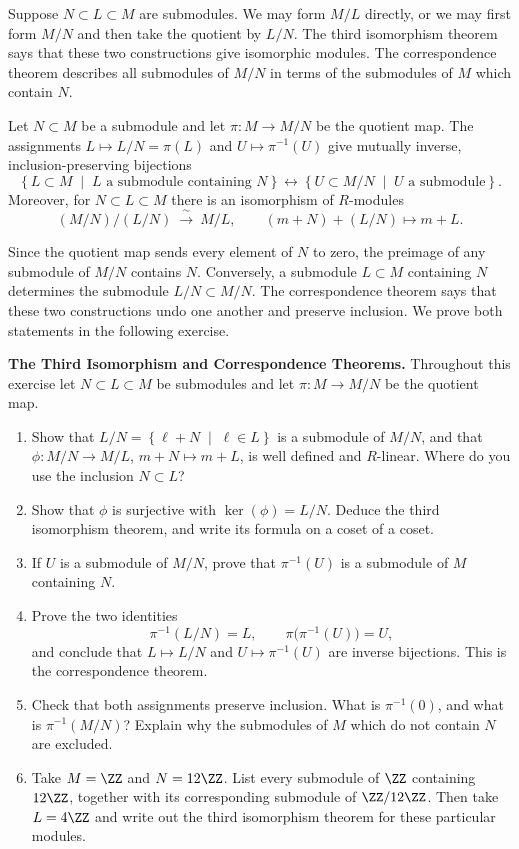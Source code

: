 \documentclass[12pt,reqno]{amsart}
\begin{document}
Suppose $N\subset L\subset M$ are submodules. We may form $M/L$ directly, or we may first form $M/N$ and then take the quotient by $L/N$. The third isomorphism theorem says that these two constructions give isomorphic modules. The correspondence theorem describes all submodules of $M/N$ in terms of the submodules of $M$ which contain $N$.

\begin{theorem}
Let $N\subset M$ be a submodule and let $\pi:M\to M/N$ be the quotient map. The assignments $L\mapsto L/N=\pi(L)$ and $U\mapsto \pi^{-1}(U)$ give mutually inverse, inclusion-preserving bijections
\[
 \left\{L\subset M \;\; \big| \;\; L\text{ a submodule containing }N\right\}
 \longleftrightarrow
 \left\{U\subset M/N \;\; \big| \;\; U\text{ a submodule}\right\}.
\]
Moreover, for $N\subset L\subset M$ there is an isomorphism of $R$-modules
\[
 (M/N)/(L/N)\ \xrightarrow{\ \sim\ }\ M/L,\qquad
 (m+N)+(L/N)\longmapsto m+L.
\]
\end{theorem}

Since the quotient map sends every element of $N$ to zero, the preimage of any submodule of $M/N$ contains $N$. Conversely, a submodule $L\subset M$ containing $N$ determines the submodule $L/N\subset M/N$. The correspondence theorem says that these two constructions undo one another and preserve inclusion. We prove both statements in the following exercise.

\hrulefill

\begin{problems}
\item\label{m:third} \textbf{The Third Isomorphism and Correspondence Theorems.} Throughout this exercise let $N\subset L\subset M$ be submodules and let $\pi:M\to M/N$ be the quotient map.
\begin{enumerate}
\item Show that $L/N=\left\{\ell+N \;\; \big| \;\; \ell\in L\right\}$ is a submodule of $M/N$, and that $\phi:M/N\to M/L$, $m+N\mapsto m+L$, is well defined and $R$-linear. Where do you use the inclusion $N\subset L$?
\item Show that $\phi$ is surjective with $\ker(\phi)=L/N$. Deduce the third isomorphism theorem, and write its formula on a coset of a coset.
\item If $U$ is a submodule of $M/N$, prove that $\pi^{-1}(U)$ is a submodule of $M$ containing $N$.
\item Prove the two identities
\[
 \pi^{-1}(L/N)=L,\qquad \pi\bigl(\pi^{-1}(U)\bigr)=U,
\]
and conclude that $L\mapsto L/N$ and $U\mapsto \pi^{-1}(U)$ are inverse bijections. This is the correspondence theorem.
\item Check that both assignments preserve inclusion. What is $\pi^{-1}(0)$, and what is $\pi^{-1}(M/N)$? Explain why the submodules of $M$ which do not contain $N$ are excluded.
\item Take $M=\ZZ$ and $N=12\ZZ$. List every submodule of $\ZZ$ containing $12\ZZ$, together with its corresponding submodule of $\ZZ/12\ZZ$. Then take $L=4\ZZ$ and write out the third isomorphism theorem for these particular modules.
\end{enumerate}
\end{problems}
\end{document}
